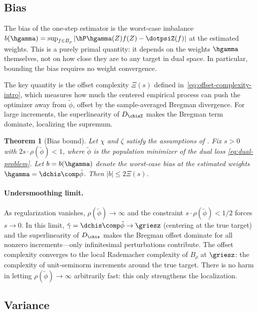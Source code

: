\documentclass{article}
\newtheorem{theorem}{Theorem}[section]
\begin{document}
\subsection{Bias}
\label{sec:bias}

The bias of the one-step estimator is the worst-case imbalance $b(\hgamma) = \sup_{f \in B_\rho} |\hP \hgamma(Z) f(Z) - \dotpsiZ(f)|$ at the estimated weights. This is a purely primal quantity: it depends on the weights $\hgamma$ themselves, not on how close they are to any target in dual space. In particular, bounding the bias requires no weight convergence.

The key quantity is the offset complexity $\Xi(s)$ defined in~\eqref{eq:offset-complexity-intro}, which measures how much the centered empirical process can push the optimizer away from $\tilde\phi$, offset by the sample-averaged Bregman divergence. For large increments, the superlinearity of $D_{\chisZ}$ makes the Bregman term dominate, localizing the supremum.

\begin{theorem}[Bias bound]
\label{thm:bias-decomp}
Let $\chi$ and $\zeta$ satisfy the assumptions of . Fix $s > 0$ with $2s \cdot \rho(\tilde\phi) < 1$, where $\tilde\phi$ is the population minimizer of the dual loss \eqref{eq:dual-problem}. Let $b = b(\hgamma)$ denote the worst-case bias at the estimated weights $\hgamma = \dchis \comp \hat\phi$. Then $|b| \le 2\Xi(s)$.
\end{theorem}

\paragraph{Undersmoothing limit.} As regularization vanishes, $\rho(\tilde\phi) \to \infty$ and the constraint $s \cdot \rho(\tilde\phi) < 1/2$ forces $s \to 0$. In this limit, $\tilde\gamma = \dchis \comp \tilde\phi \to \griesz$ (centering at the true target) and the superlinearity of $D_{\chis}$ makes the Bregman offset dominate for all nonzero increments---only infinitesimal perturbations contribute. The offset complexity converges to the local Rademacher complexity of $B_\rho$ at $\griesz$: the complexity of unit-seminorm increments around the true target. There is no harm in letting $\rho(\tilde\phi) \to \infty$ arbitrarily fast: this only strengthens the localization.

\subsection{Variance}
\label{sec:variance}
\end{document}
